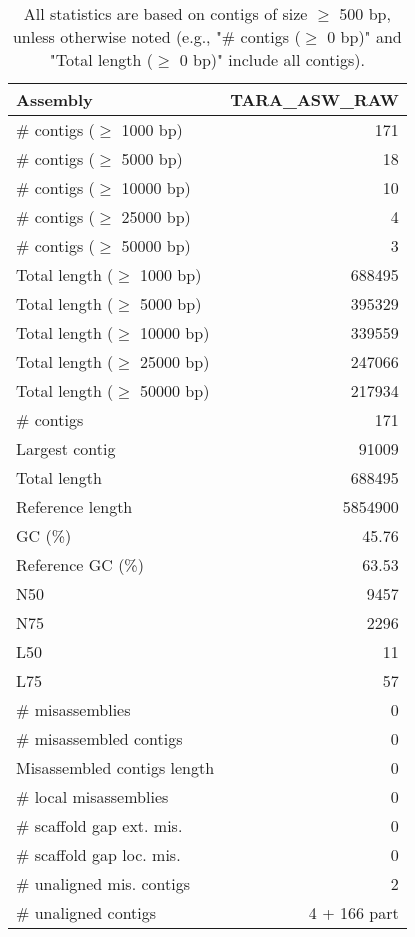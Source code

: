 \documentclass[12pt,a4paper]{article}
\begin{document}
\begin{table}[ht]
\begin{center}
\caption{All statistics are based on contigs of size $\geq$ 500 bp, unless otherwise noted (e.g., "\# contigs ($\geq$ 0 bp)" and "Total length ($\geq$ 0 bp)" include all contigs).}
\begin{tabular}{|l*{1}{|r}|}
\hline
Assembly & TARA\_ASW\_RAW \\ \hline
\# contigs ($\geq$ 1000 bp) & 171 \\ \hline
\# contigs ($\geq$ 5000 bp) & 18 \\ \hline
\# contigs ($\geq$ 10000 bp) & 10 \\ \hline
\# contigs ($\geq$ 25000 bp) & 4 \\ \hline
\# contigs ($\geq$ 50000 bp) & 3 \\ \hline
Total length ($\geq$ 1000 bp) & 688495 \\ \hline
Total length ($\geq$ 5000 bp) & 395329 \\ \hline
Total length ($\geq$ 10000 bp) & 339559 \\ \hline
Total length ($\geq$ 25000 bp) & 247066 \\ \hline
Total length ($\geq$ 50000 bp) & 217934 \\ \hline
\# contigs & 171 \\ \hline
Largest contig & 91009 \\ \hline
Total length & 688495 \\ \hline
Reference length & 5854900 \\ \hline
GC (\%) & 45.76 \\ \hline
Reference GC (\%) & 63.53 \\ \hline
N50 & 9457 \\ \hline
N75 & 2296 \\ \hline
L50 & 11 \\ \hline
L75 & 57 \\ \hline
\# misassemblies & 0 \\ \hline
\# misassembled contigs & 0 \\ \hline
Misassembled contigs length & 0 \\ \hline
\# local misassemblies & 0 \\ \hline
\# scaffold gap ext. mis. & 0 \\ \hline
\# scaffold gap loc. mis. & 0 \\ \hline
\# unaligned mis. contigs & 2 \\ \hline
\# unaligned contigs & 4 + 166 part \\ \hline

\end{tabular}
\end{center}
\end{table}
\end{document}
